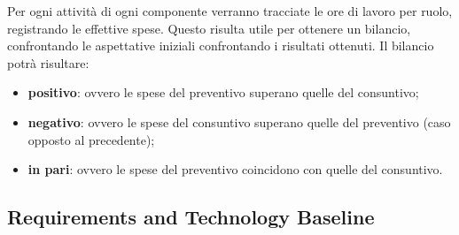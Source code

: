Per ogni attività di ogni componente verranno tracciate le ore di lavoro per ruolo, registrando le effettive spese. Questo risulta utile per ottenere un bilancio, confrontando le aspettative iniziali confrontando i risultati ottenuti. Il bilancio potrà risultare:
\begin{itemize}
    \item \textbf{positivo}: ovvero le spese del preventivo superano quelle del consuntivo;
    \item \textbf{negativo}: ovvero le spese del consuntivo superano quelle del preventivo (caso opposto al precedente);
    \item \textbf{in pari}: ovvero le spese del preventivo coincidono con quelle del consuntivo.
\end{itemize}

\subsection{Requirements and Technology Baseline} 
